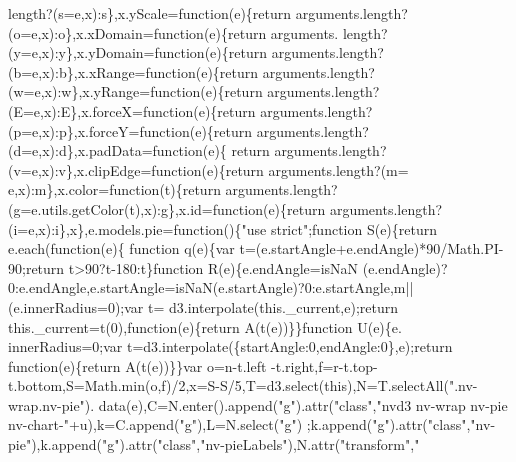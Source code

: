 \begin{DoxyCode}
      length?(s=e,x):s\},x.yScale=\textcolor{keyword}{function}(e)\{\textcolor{keywordflow}{return} arguments.length?(o=e,x):o\},x.xDomain=\textcolor{keyword}{function}(e)\{\textcolor{keywordflow}{return} arguments.
      length?(y=e,x):y\},x.yDomain=\textcolor{keyword}{function}(e)\{\textcolor{keywordflow}{return} arguments.length?(b=e,x):b\},x.xRange=\textcolor{keyword}{function}(e)\{\textcolor{keywordflow}{return} 
      arguments.length?(w=e,x):w\},x.yRange=\textcolor{keyword}{function}(e)\{\textcolor{keywordflow}{return} arguments.length?(E=e,x):E\},x.forceX=\textcolor{keyword}{function}(e)\{\textcolor{keywordflow}{return} 
      arguments.length?(p=e,x):p\},x.forceY=\textcolor{keyword}{function}(e)\{\textcolor{keywordflow}{return} arguments.length?(d=e,x):d\},x.padData=\textcolor{keyword}{function}(e)\{\textcolor{keywordflow}{
      return} arguments.length?(v=e,x):v\},x.clipEdge=\textcolor{keyword}{function}(e)\{\textcolor{keywordflow}{return} arguments.length?(m=
      e,x):m\},x.color=\textcolor{keyword}{function}(t)\{\textcolor{keywordflow}{return} arguments.length?(g=e.utils.getColor(t),x):g\},x.id=\textcolor{keyword}{function}(e)\{\textcolor{keywordflow}{return} 
      arguments.length?(i=e,x):i\},x\},e.models.pie=\textcolor{keyword}{function}()\{\textcolor{stringliteral}{"use strict"};\textcolor{keyword}{function} S(e)\{\textcolor{keywordflow}{return} e.each(\textcolor{keyword}{function}(e)\{\textcolor{keyword}{
      function} q(e)\{var t=(e.startAngle+e.endAngle)*90/Math.PI-90;\textcolor{keywordflow}{return} t>90?t-180:t\}\textcolor{keyword}{function} R(e)\{e.endAngle=isNaN
      (e.endAngle)?0:e.endAngle,e.startAngle=isNaN(e.startAngle)?0:e.startAngle,m||(e.innerRadius=0);var t=
      d3.interpolate(this.\_current,e);\textcolor{keywordflow}{return} this.\_current=t(0),\textcolor{keyword}{function}(e)\{\textcolor{keywordflow}{return} A(t(e))\}\}\textcolor{keyword}{function} U(e)\{e.
      innerRadius=0;var t=d3.interpolate(\{startAngle:0,endAngle:0\},e);\textcolor{keywordflow}{return} \textcolor{keyword}{function}(e)\{\textcolor{keywordflow}{return} A(t(e))\}\}var o=n-t.left
      -t.right,f=r-t.top-t.bottom,S=Math.min(o,f)/2,x=S-S/5,T=d3.select(\textcolor{keyword}{this}),N=T.selectAll(\textcolor{stringliteral}{".nv-wrap.nv-pie"}).
      data(e),C=N.enter().append(\textcolor{stringliteral}{"g"}).attr(\textcolor{stringliteral}{"class"},\textcolor{stringliteral}{"nvd3 nv-wrap nv-pie nv-chart-"}+u),k=C.append(\textcolor{stringliteral}{"g"}),L=N.select(\textcolor{stringliteral}{"g"})
      ;k.append(\textcolor{stringliteral}{"g"}).attr(\textcolor{stringliteral}{"class"},\textcolor{stringliteral}{"nv-pie"}),k.append(\textcolor{stringliteral}{"g"}).attr(\textcolor{stringliteral}{"class"},\textcolor{stringliteral}{"nv-pieLabels"}),N.attr(\textcolor{stringliteral}{"transform"},\textcolor{stringliteral}{"
}
\end{DoxyCode}
